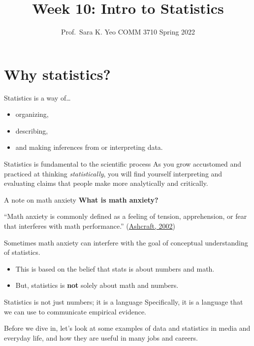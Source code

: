 \documentclass[
  ignorenonframetext,
]{beamer}
\title{Week 10: Intro to Statistics}
\author{Prof.~Sara K. Yeo \textbar{} COMM 3710 \textbar{} Spring 2022}
\date{}
\providecommand{\tightlist}{%
  \setlength{\itemsep}{0pt}\setlength{\parskip}{0pt}}
\begin{document}
\frame{\titlepage}

\begin{frame}
\end{frame}

\hypertarget{why-statistics}{%
\section{Why statistics?}\label{why-statistics}}

\begin{frame}{}
\protect\hypertarget{section}{}
Statistics is a way of\ldots{}

\begin{itemize}[<+->]
\tightlist
\item
  organizing,
\item
  describing,
\item
  and making inferences from or interpreting data.
\end{itemize}
\end{frame}

\begin{frame}{Statistics is fundamental to the scientific process}
\protect\hypertarget{statistics-is-fundamental-to-the-scientific-process}{}
As you grow accustomed and practiced at thinking \emph{statistically},
you will find yourself interpreting and evaluating claims that people
make more analytically and critically.
\end{frame}

\begin{frame}{A note on math anxiety}
\protect\hypertarget{a-note-on-math-anxiety}{}
\textbf{What is math anxiety?}

``Math anxiety is commonly defined as a feeling of tension,
apprehension, or fear that interferes with math performance.''
(\href{https://doi.org/10.1111/1467-8721.00196}{Ashcraft, 2002})

Sometimes math anxiety can interfere with the goal of conceptual
understanding of statistics.

\begin{itemize}[<+->]
\tightlist
\item
  This is based on the belief that stats is about numbers and math.
\item
  But, statistics is \textbf{not} solely about math and numbers.
\end{itemize}
\end{frame}

\begin{frame}{Statistics is not just numbers; it is a language}
\protect\hypertarget{statistics-is-not-just-numbers-it-is-a-language}{}
Specifically, it is a language that we can use to communicate empirical
evidence.

Before we dive in, let's look at some examples of data and statistics in
media and everyday life, and how they are useful in many jobs and
careers.
\end{frame}
\end{document}
